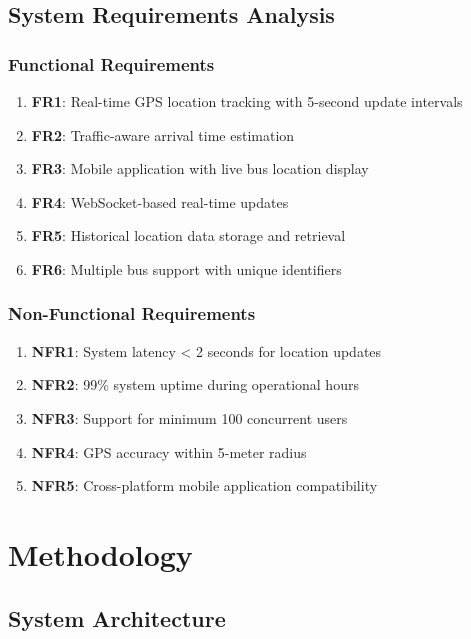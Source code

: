 \documentclass[12pt,a4paper]{article}
\begin{document}
\subsection{System Requirements Analysis}

\subsubsection{Functional Requirements}

\begin{enumerate}
    \item \textbf{FR1}: Real-time GPS location tracking with 5-second update intervals
    \item \textbf{FR2}: Traffic-aware arrival time estimation
    \item \textbf{FR3}: Mobile application with live bus location display
    \item \textbf{FR4}: WebSocket-based real-time updates
    \item \textbf{FR5}: Historical location data storage and retrieval
    \item \textbf{FR6}: Multiple bus support with unique identifiers
\end{enumerate}

\subsubsection{Non-Functional Requirements}

\begin{enumerate}
    \item \textbf{NFR1}: System latency < 2 seconds for location updates
    \item \textbf{NFR2}: 99\% system uptime during operational hours
    \item \textbf{NFR3}: Support for minimum 100 concurrent users
    \item \textbf{NFR4}: GPS accuracy within 5-meter radius
    \item \textbf{NFR5}: Cross-platform mobile application compatibility
\end{enumerate}

\section{Methodology}

\subsection{System Architecture}
\end{document}
